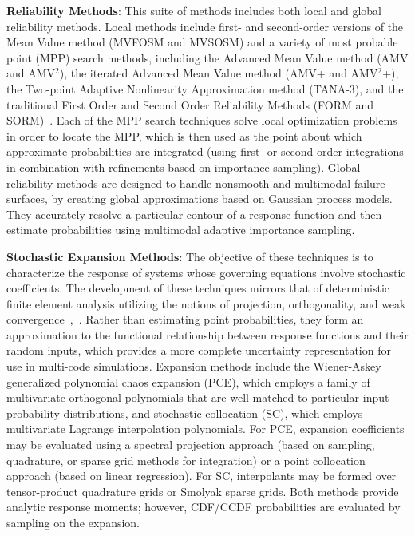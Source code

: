 \textbf{Reliability Methods}: This suite of methods includes both
local and global reliability methods. Local methods include first-
and second-order versions of the Mean Value method (MVFOSM and MVSOSM)
and a variety of most probable point (MPP) search methods, including
the Advanced Mean Value method (AMV and AMV$^2$), the iterated
Advanced Mean Value method (AMV+ and AMV$^2$+), the Two-point Adaptive
Nonlinearity Approximation method (TANA-3), and the traditional First
Order and Second Order Reliability Methods (FORM and
SORM)~\cite{Hal00}. Each of the MPP search techniques solve local
optimization problems in order to locate the MPP, which is then used
as the point about which approximate probabilities are integrated
(using first- or second-order integrations in combination with
refinements based on importance sampling). 
Global reliability methods are designed to handle
nonsmooth and multimodal failure surfaces, by creating global
approximations based on Gaussian process models. They accurately
resolve a particular contour of a response function and then estimate
probabilities using multimodal adaptive importance sampling.

\textbf{Stochastic Expansion Methods}: The objective of these
techniques is to characterize the response of systems whose governing
equations involve stochastic coefficients. The development of these
techniques mirrors that of deterministic finite element analysis
utilizing the notions of projection, orthogonality, and weak
convergence~\cite{Gha99},~\cite{Gha91}. Rather than estimating point
probabilities, they form an approximation to the functional
relationship between response functions and their random inputs, which
provides a more complete uncertainty representation for use in
multi-code simulations. Expansion methods include the Wiener-Askey
generalized polynomial chaos expansion (PCE), which employs a family
of multivariate orthogonal polynomials that are well matched to
particular input probability distributions, and stochastic collocation
(SC), which employs multivariate Lagrange interpolation polynomials.
For PCE, expansion coefficients may be evaluated using a spectral
projection approach (based on sampling, quadrature, or sparse grid
methods for integration) or a point collocation approach (based on
linear regression). For SC, interpolants may be formed over
tensor-product quadrature grids or Smolyak sparse grids. Both methods
provide analytic response moments; however, CDF/CCDF probabilities are
evaluated by sampling on the expansion.

